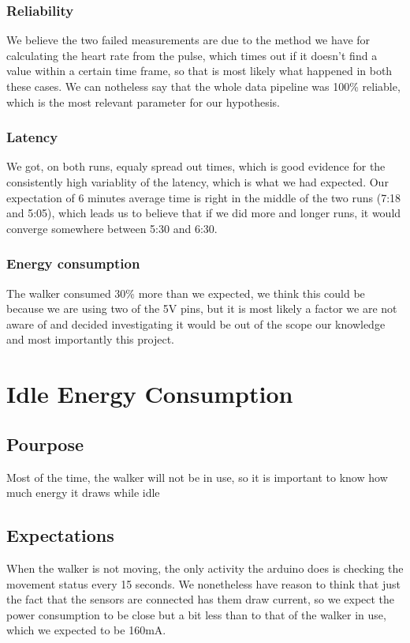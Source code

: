 		\subsubsection{Reliability}
			We believe the two failed measurements are due to the method we have for calculating the heart rate from the pulse, which times out if it doesn't find a value within a certain time frame, so that is most likely what happened in both these cases. We can notheless say that the whole data pipeline was 100\% reliable, which is the most relevant parameter for our hypothesis.

		\subsubsection{Latency}
			We got, on both runs, equaly spread out times, which is good evidence for the consistently high variablity of the latency, which is what we had expected. Our expectation of 6 minutes average time is right in the middle of the two runs (7:18 and 5:05), which leads us to believe that if we did more and longer runs, it would converge somewhere between 5:30 and 6:30.

		\subsubsection{Energy consumption}
			The walker consumed 30\% more than we expected, we think this could be because we are using two of the 5V pins, but it is most likely a factor we are not aware of and decided investigating it would be out of the scope our knowledge and most importantly this project.

\section{Idle Energy Consumption}

	\subsection{Pourpose}
		Most of the time, the walker will not be in use, so it is important to know how much energy it draws while idle
	\subsection{Expectations}
		When the walker is not moving, the only activity the arduino does is checking the movement status every 15 seconds. We nonetheless have reason to think that just the fact that the sensors are connected has them draw current, so we expect the power consumption to be close but a bit less than to that of the walker in use, which we expected to be 160mA.
